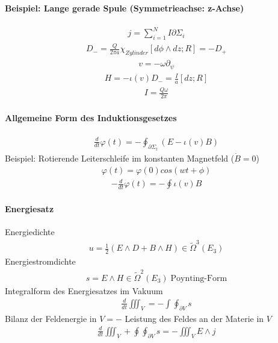 \documentclass[10pt,a4paper]{article}
\begin{document}
\paragraph{Beispiel: Lange gerade Spule (Symmetrieachse: z-Achse)} $\,$ \\
\begin{align}
j= \sum_{i=1}^N I \partial \Sigma _i
\end{align}
\begin{align}
D_-= \frac{Q}{2 \pi a} \chi_{Zylinder} [d \phi \wedge dz ; R] =-D_+
\end{align}
\begin{align}
v= - \omega \partial_{\psi}
\end{align}
\begin{align}
H= - \iota (v) D_-= \frac{I}{a} [ dz;R]
\end{align}
\begin{align}
I=\frac{Q \omega}{2 \pi}
\end{align}
\paragraph{Allgemeine Form des Induktionsgesetzes} $\,$ \\
\begin{align}
\frac{d}{dt} \varphi (t) = -\oint_{\partial \Sigma_t} (E- \iota (v) B)
\end{align}
Beispiel: Rotierende Leiterschleife im konstanten Magnetfeld ($ \dot{B} = 0$)
\begin{align}
\varphi (t) = \varphi (0) cos(wt+\phi)
\end{align}
\begin{align}
-\frac{d}{dt} \varphi (t) = -\oint \iota (v) B
\end{align}
\paragraph{Energiesatz} $\,$ \\
Energiedichte
\begin{align}
u= \frac{1}{2} (E \wedge D + B \wedge H) \in \tilde{\Omega}^3 (E_3)
\end{align}
Energiestromdichte
\begin{align}
s= E \wedge H \in \tilde{\Omega}^2 (E_3) \; \text{Poynting-Form}
\end{align}
Integralform des Energiesatzes im Vakuum
\begin{align}
\frac{d}{dt} \iiint_V = - \int \oint_{\partial V} s 
\end{align}
Bilanz der Feldenergie in $V=- $ Leistung des Feldes an der Materie in $V$
\begin{align}
\frac{d}{dt} \iiint_V + \oint \oint_{\partial V} s = -\iiint_V E \wedge j
\end{align}
\end{document}
